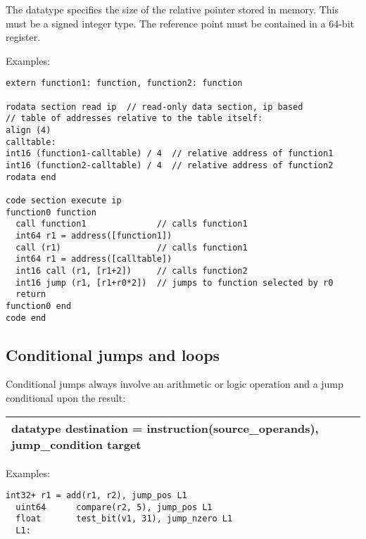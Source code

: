 \documentclass[forwardcom.tex]{subfiles}
\begin{document}
The datatype specifies the size of the relative pointer stored in memory. This must be a signed integer type. The reference point must be contained in a 64-bit register.
\vspace{2mm}

Examples:
\vspace{2mm}

\begin{lstlisting}[frame=single]
extern function1: function, function2: function

rodata section read ip  // read-only data section, ip based
// table of addresses relative to the table itself:
align (4)
calltable:                       
int16 (function1-calltable) / 4  // relative address of function1
int16 (function2-calltable) / 4  // relative address of function2
rodata end

code section execute ip
function0 function
  call function1              // calls function1
  int64 r1 = address([function1])
  call (r1)                   // calls function1
  int64 r1 = address([calltable])
  int16 call (r1, [r1+2])     // calls function2
  int16 jump (r1, [r1+r0*2])  // jumps to function selected by r0
  return
function0 end
code end

\end{lstlisting}
\vspace{2mm}


\subsection{Conditional jumps and loops} \label{assemblyConditionalJumps}

Conditional jumps always involve an arithmetic or logic operation and a jump conditional upon the result:

\begin{tabular}{|p{150mm}|}
\hline
\hspace{4mm} datatype destination = instruction(source\_operands), jump\_condition target \\
\hline
\end{tabular}
\vspace{4mm}

Examples:
\vspace{2mm}

\begin{lstlisting}[frame=single]
  int32+ r1 = add(r1, r2), jump_pos L1
  uint64      compare(r2, 5), jump_pos L1
  float       test_bit(v1, 31), jump_nzero L1
  L1:
\end{lstlisting}
\vspace{2mm}
\end{document}
